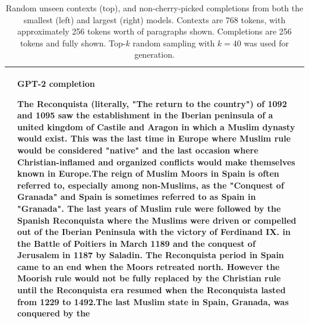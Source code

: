 \documentclass{article}
\begin{document}
\begin{table}[t]
\begin{center}
\begin{tabular}{|p{8cm}|p{8cm}|}
  &
  \centerline{\textbf{GPT-2 completion}}
\phantom \newline \newline The Reconquista (literally, "The return to the country") of 1092 and 1095 saw the establishment in the Iberian peninsula of a united kingdom of Castile and Aragon in which a Muslim dynasty would exist. This was the last time in Europe where Muslim rule would be considered "native" and the last occasion where Christian-inflamed and organized conflicts would make themselves known in Europe.\newline \newline The reign of Muslim Moors in Spain is often referred to, especially among non-Muslims, as the "Conquest of Granada" and Spain is sometimes referred to as Spain in "Granada". The last years of Muslim rule were followed by the Spanish Reconquista where the Muslims were driven or compelled out of the Iberian Peninsula with the victory of Ferdinand IX. in the Battle of Poitiers in March 1189 and the conquest of Jerusalem in 1187 by Saladin. \newline \newline The Reconquista period in Spain came to an end when the Moors retreated north. However the Moorish rule would not be fully replaced by the Christian rule until the Reconquista era resumed when the Reconquista lasted from 1229 to 1492.\newline \newline The last Muslim state in Spain, Granada, was conquered by the

 \\
\hline


\end{tabular}
\caption{Random unseen contexts (top), and non-cherry-picked completions from both the smallest (left) and largest (right) models. Contexts are 768 tokens, with approximately 256 tokens worth of paragraphs shown.  Completions are 256 tokens and fully shown.
Top-$k$ random sampling with $k = 40$ was used for generation.}
\label{samplescompare2}
\end{center}
\end{table}
\end{document}
